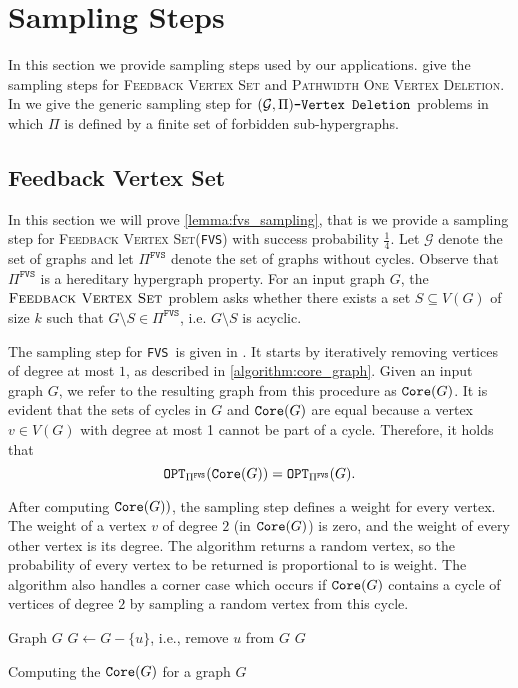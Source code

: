 \documentclass[letterpaper,11pt]{article}
\newcommand{\1}[1]{\mathds{1}\left[#1\right]}
\newcommand{\core}[1]{\textnormal{\texttt{Core}}(#1)}
\newcommand{\OPT}{\textnormal{\texttt{OPT}}}
\newcommand{\gpivd}[1][\mathcal{G},\Pi]{(#1)\textnormal{\texttt{-Vertex Deletion}}}
\newcommand{\FVS}{\textnormal{\texttt{FVS}}\xspace}
\newcommand{\fvsPi}{\Pi^{\texttt{FVS}}}
\newcommand{\fvs}{\textsc{Feedback Vertex Set}\xspace}
\newcommand{\povd}{\textsc{Pathwidth One Vertex Deletion}\xspace}
\begin{document}
 
\section{Sampling Steps}
\label{sec:sampling_step}
In this section we  provide sampling steps used by our applications.  give the sampling steps for \fvs and \povd. In  we give the generic sampling step for $\gpivd$ problems in which $\Pi$ is  defined by a finite set of forbidden sub-hypergraphs. 

\subsection{Feedback Vertex Set}
\label{sec:fvs}
In this section we will prove \cref{lemma:fvs_sampling}, that is we provide 
a sampling step for \fvs (\FVS) with success probability $\frac{1}{4}$. 
Let $\mathcal{G}$ denote the set of graphs and
let $\fvsPi$ denote the set of graphs without cycles.
Observe that $\fvsPi$ is a hereditary hypergraph property.
For an input graph $G$, the $\fvs$ problem asks whether there exists a set $S \subseteq V(G)$ of size $k$ such that $G \setminus S \in \fvsPi$, i.e. $G \setminus S$ is acyclic.

The sampling step for \FVS\ is given in .  It starts by iteratively removing vertices of degree at most $1$,
as described in \cref{algorithm:core_graph}.
Given an input graph $G$, we refer to the resulting graph from this procedure
as $\core{G}$.
It is evident that the sets of cycles in $G$ and $\core{G}$
are equal because a vertex $v \in V(G)$ with degree at most 1 cannot be
part of a cycle.
Therefore, it holds that
\begin{equation}\label{eq:G_cycle_core}
	\OPT_{\fvsPi}(\core{G}) = \OPT_{\fvsPi}(G).		
\end{equation}

After computing $\core{G})$, the sampling step defines a weight for every vertex.
The weight of a vertex $v$ of degree $2$ (in $\core{G}$) is zero, and the weight of every other vertex is its degree. The algorithm returns a random vertex, so the probability of every vertex to be returned is proportional to is weight.  The algorithm also handles a corner case which occurs if $\core{G}$ contains a cycle of vertices of degree $2$ by sampling a random vertex from this cycle. 
\begin{algorithm}
	\begin{algorithmic}[1]
		\Input Graph $G$
			\State $G\leftarrow G- \{u\}$, i.e., remove $u$ from $G$
		\EndWhile
		\State \Return $G$
	\end{algorithmic}
	\caption{Computing the $\core{G}$ for a graph $G$}\label{algorithm:core_graph}
\end{algorithm}
\end{document}
